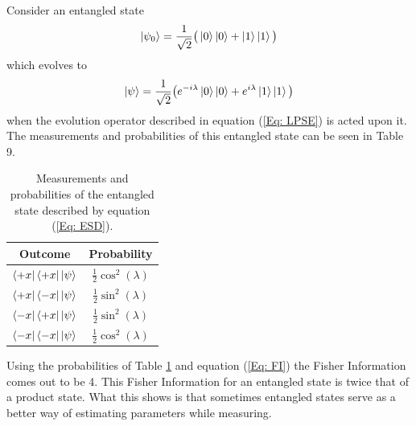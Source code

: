 \documentclass[twocolumn]{article}
\begin{document}
Consider an entangled state
\begin{equation} \label{Eq: ESD}
\ket{\psi_0}=\frac{1}{\sqrt{2}}\big(\ket{0}\ket{0}+\ket{1}\ket{1}\big)
\end{equation}
which evolves to 
\begin{equation} \label{Eq: ESEE}
\ket{\psi}=\frac{1}{\sqrt{2}}\big(e^{-i\lambda}\ket{0}\ket{0}+e^{i\lambda}\ket{1}\ket{1}\big)
\end{equation}
when the evolution operator described in equation (\ref{Eq: LPSE}) is acted upon it. The measurements and probabilities of this entangled state can be seen in Table 9.
\begin{table}[ht]
    \centering
    \begin{tabular}{|c|c|}
         \hline Outcome & Probability \\
         \hline $\bra{+x}\bra{+x}\ket{\psi}$ & $\frac{1}{2}\cos^2{(\lambda)}$ \\
         \hline $\bra{+x}\bra{-x}\ket{\psi}$ & $\frac{1}{2}\sin^2{(\lambda)}$ \\
         \hline $\bra{-x}\bra{+x}\ket{\psi}$ & $\frac{1}{2}\sin^2{(\lambda)}$ \\
         \hline $\bra{-x}\bra{-x}\ket{\psi}$ & $\frac{1}{2}\cos^2{(\lambda)}$ \\
         \hline
    \end{tabular}
    \caption{\footnotesize{Measurements and probabilities of the entangled state described by equation (\ref{Eq: ESD}).}}
    \label{Tab: POES}
\end{table}
\par \noindent 
Using the probabilities of Table \ref{Tab: POES} and equation (\ref{Eq: FI}) the Fisher Information comes out to be 4. This Fisher Information for an entangled state is twice that of a product state. What this shows is that sometimes entangled states serve as a better way of estimating parameters while measuring.
\end{document}
